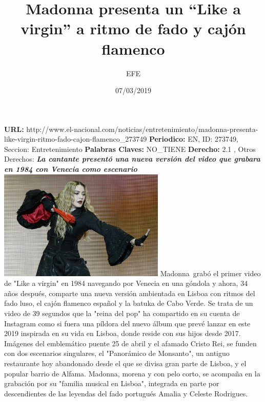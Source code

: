 \documentclass{article}%
\title{\textbf{Madonna presenta un “Like a virgin” a ritmo de fado y cajón flamenco}}%
\author{EFE}%
\date{07/03/2019}%
\begin{document}
%
\normalsize%
\maketitle%
\textbf{URL: }%
http://www.el{-}nacional.com/noticias/entretenimiento/madonna{-}presenta{-}like{-}virgin{-}ritmo{-}fado{-}cajon{-}flamenco\_273749\newline%
%
\textbf{Periodico: }%
EN, %
ID: %
273749, %
Seccion: %
Entretenimiento\newline%
%
\textbf{Palabras Claves: }%
NO\_TIENE\newline%
%
\textbf{Derecho: }%
2.1%
, Otros Derechos: %
\newline%
%
\textbf{\textit{La cantante presentó una nueva versión del video que grabara en 1984 con Venecia como escenario}}%
\newline%
\newline%
%
\includegraphics[width=300px]{EN_273749.jpg}%
\newline%
%
Madonna~grabó el primer video de "Like a virgin" en 1984 navegando por Venecia en una góndola y ahora, 34 años después, comparte una nueva versión ambientada en Lisboa con ritmos del fado luso, el cajón flamenco español y la batuka de Cabo Verde.%
\newline%
%
Se trata de un video de 39 segundos que la "reina del pop" ha compartido en su cuenta de Instagram como si fuera una píldora del nuevo álbum que prevé lanzar en este 2019 inspirada en su vida en Lisboa, donde reside con sus hijos desde 2017.%
\newline%
%
Imágenes del emblemático puente 25 de abril y el afamado Cristo Rei, se funden con dos escenarios singulares, el "Panorámico de Monsanto", un antiguo restaurante hoy abandonado desde el que se divisa gran parte de Lisboa, y el popular barrio de Alfama.%
\newline%
%
Madonna, morena y con pelo corto, se acompaña en la grabación por su "familia musical en Lisboa", integrada en parte por descendientes de las leyendas del fado portugués Amalia y Celeste Rodrigues.%
\end{document}
